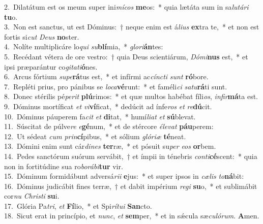 {2.~}Dilatátum est os meum super ini\textit{mí}\textit{cos} \textbf{me}os:~* quia lætáta sum in sa\textit{lu}\textit{tá}\textit{ri} \textbf{tu}o.\\
{3.~}Non est sanctus, ut est Dóminus:~† neque enim est á\textit{li}\textit{us} \textbf{ex}tra te,~* et non est fortis si\textit{cut} \textit{De}\textit{us} \textbf{no}ster.\\
{4.~}Nolíte multiplicáre lo\textit{qui} \textit{su}\textbf{blí}mia,~* \textit{glo}\textit{ri}\textbf{án}tes:\\
{5.~}Recédant vétera de ore vestro:~† quia Deus scientiárum, \textit{Dó}\textit{mi}\textbf{nus} est,~* et ipsi præparántur co\textit{gi}\textit{ta}\textit{ti}\textbf{ó}nes.\\
{6.~}Arcus fórtium \textit{su}\textit{pe}\textbf{rá}tus est,~* et infírmi ac\textit{cín}\textit{cti} \textit{sunt} \textbf{ró}bore.\\
{7.~}Repléti prius, pro pánibus se \textit{lo}\textit{ca}\textbf{vé}runt:~* et faméli\textit{ci} \textit{sa}\textit{tu}\textbf{rá}ti sunt.\\
{8.~}Donec stérilis pé\textit{pe}\textit{rit} \textbf{plú}rimos:~* et quæ multos habébat fíli\textit{os}, \textit{in}\textit{fir}\textbf{má}ta est.\\
{9.~}Dóminus mortíficat \textit{et} \textit{vi}\textbf{ví}ficat,~* dedúcit ad ínfe\textit{ros} \textit{et} \textit{re}\textbf{dú}cit.\\
{10.~}Dóminus páuperem fa\textit{cit} \textit{et} \textbf{di}tat,~* humí\textit{li}\textit{at} \textit{et} \textbf{sú}blevat.\\
{11.~}Súscitat de púlve\textit{re} \textit{e}\textbf{gé}num,~* et de stércore \textit{é}\textit{le}\textit{vat} \textbf{páu}perem:\\
{12.~}Ut sédeat \textit{cum} \textit{prin}\textbf{cí}pibus,~* et sólium \textit{gló}\textit{ri}\textit{æ} \textbf{té}neat.\\
{13.~}Dómini enim sunt cár\textit{di}\textit{nes} \textbf{ter}ræ,~* et pósuit su\textit{per} \textit{e}\textit{os} \textbf{or}bem.\\
{14.~}Pedes sanctórum suórum servábit,~† et ímpii in ténebris \textit{con}\textit{ti}\textbf{cé}scent:~* quia non in fortitúdine sua ro\textit{bo}\textit{rá}\textit{bi}\textbf{tur} vir.\\
{15.~}Dóminum formidábunt adversá\textit{ri}\textit{i} \textbf{e}jus:~* et super ipsos in \textit{cæ}\textit{lis} \textit{to}\textbf{ná}bit:\\
{16.~}Dóminus judicábit fines terræ,~† et dabit impérium \textit{re}\textit{gi} \textbf{su}o,~* et sublimábit cor\textit{nu} \textit{Chri}\textit{sti} \textbf{su}i.\\
{17.~}Glória Pa\textit{tri}, \textit{et} \textbf{Fí}lio,~* et Spi\textit{rí}\textit{tu}\textit{i} \textbf{San}cto.\\
{18.~}Sicut erat in princípio, et \textit{nunc}, \textit{et} \textbf{sem}per,~* et in sǽcula sæ\textit{cu}\textit{ló}\textit{rum}. \textbf{A}men.\\
